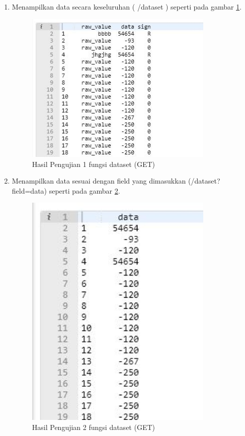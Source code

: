 \begin{enumerate}
\item Menampilkan data secara keseluruhan ( /dataset ) seperti pada gambar \ref{fig:hujifd1}.
\begin{figure}[!htbp]
	\centerline{\includegraphics[width=0.85\textwidth]{figures/10/hujifd1.PNG}}
	\caption{Hasil Pengujian 1 fungsi dataset (GET)}
	\label{fig:hujifd1}
\end{figure}

\item Menampilkan data sesuai dengan field yang dimasukkan (/dataset?field=data) seperti pada gambar \ref{fig:hujifd2}.
\begin{figure}[!htbp]
	\centerline{\includegraphics[width=0.85\textwidth]{figures/10/hujifd2.PNG}}
	\caption{Hasil Pengujian 2 fungsi dataset (GET)}
	\label{fig:hujifd2}
\end{figure}


\end{enumerate}

